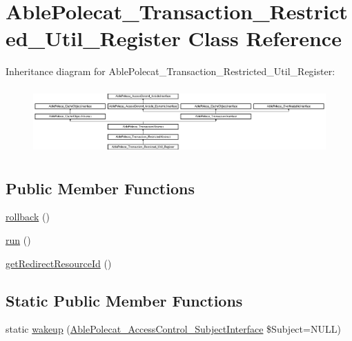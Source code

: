 \hypertarget{class_able_polecat___transaction___restricted___util___register}{}\section{Able\+Polecat\+\_\+\+Transaction\+\_\+\+Restricted\+\_\+\+Util\+\_\+\+Register Class Reference}
\label{class_able_polecat___transaction___restricted___util___register}
Inheritance diagram for Able\+Polecat\+\_\+\+Transaction\+\_\+\+Restricted\+\_\+\+Util\+\_\+\+Register\+:\begin{figure}[H]
\begin{center}
\leavevmode
\includegraphics[height=2.560976cm]{class_able_polecat___transaction___restricted___util___register}
\end{center}
\end{figure}
\subsection*{Public Member Functions}
\begin{DoxyCompactItemize}
\item 
\hyperlink{class_able_polecat___transaction___restricted___util___register_afa549adf79e3f8c09fe8f903dd5fbfa7}{rollback} ()
\item 
\hyperlink{class_able_polecat___transaction___restricted___util___register_afb0fafe7e02a3ae1993c01c19fad2bae}{run} ()
\item 
\hyperlink{class_able_polecat___transaction___restricted___util___register_abd12d28cbfdd5a45fba85bbac51a0b12}{get\+Redirect\+Resource\+Id} ()
\end{DoxyCompactItemize}
\subsection*{Static Public Member Functions}
\begin{DoxyCompactItemize}
\item 
static \hyperlink{class_able_polecat___transaction___restricted___util___register_a3f2135f6ad45f51d075657f6d20db2cd}{wakeup} (\hyperlink{interface_able_polecat___access_control___subject_interface}{Able\+Polecat\+\_\+\+Access\+Control\+\_\+\+Subject\+Interface} \$Subject=N\+U\+L\+L)
\end{DoxyCompactItemize}
